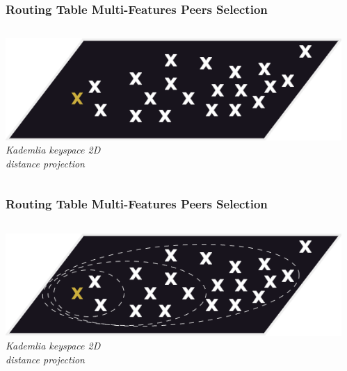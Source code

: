 \documentclass{../pl-slide}
\begin{document}
\begin{frame}
\frametitle{Routing Table Multi-Features Peers Selection}
\begin{columns}[onlytextwidth]
	\begin{column}{0.49\textwidth}
	    		\begin{center}
        		\includegraphics[scale=.35]{resources/1-plan.png}\\
        		\medskip
        		\textit{Kademlia keyspace 2D\\distance projection}
        		\end{center}
	\end{column}
	\begin{column}{0.49\textwidth}
	\end{column}

\end{columns}
\end{frame}

\begin{frame}
\frametitle{Routing Table Multi-Features Peers Selection}
\begin{columns}[onlytextwidth]
	\begin{column}{0.49\textwidth}
	    		\begin{center}
        		\includegraphics[scale=.35]{resources/1-plan-buckets.png}\\
        		\medskip
        		\textit{Kademlia keyspace 2D\\distance projection}
        		\end{center}
	\end{column}
	\begin{column}{0.49\textwidth}
	\end{column}

\end{columns}
\end{frame}
\end{document}
